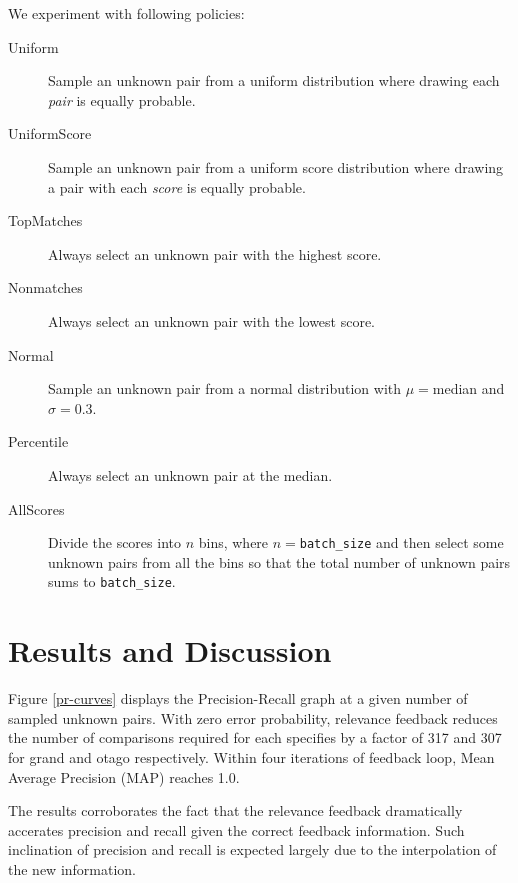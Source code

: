 We experiment with following policies:
\begin{description}
  \item [Uniform]
  Sample an unknown pair from a uniform distribution where drawing each \emph{pair} is equally probable.
  \item [UniformScore]
  Sample an unknown pair from a uniform score distribution where drawing a pair with each \emph{score} is equally probable.
  \item [TopMatches]
  Always select an unknown pair with the highest score.
  \item [Nonmatches]
  Always select an unknown pair with the lowest score.
  \item [Normal]
  Sample an unknown pair from a normal distribution with $\mu=$median and $\sigma=0.3$.
  \item [Percentile]
  Always select an unknown pair at the median.
  \item [AllScores]
  Divide the scores into $n$ bins, where $n=$\texttt{batch\_size} and then select some unknown pairs from all the bins so that the total number of unknown pairs sums to \texttt{batch\_size}.
\end{description}



\section{Results and Discussion} %
\label{sec:results}
Figure \ref{pr-curves} displays the Precision-Recall graph at a given number of sampled unknown pairs. With zero error probability, relevance feedback reduces the number of comparisons required for each specifies by a factor of 317 and 307 for grand and otago respectively. Within four iterations of feedback loop, Mean Average Precision (MAP) reaches 1.0.

The results corroborates the fact that the relevance feedback dramatically accerates precision and recall given the correct feedback information. Such inclination of precision and recall is expected largely due to the interpolation of the new information.

